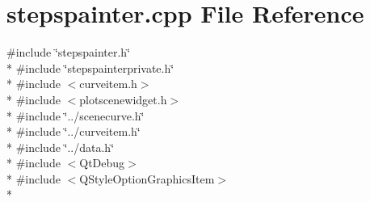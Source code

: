 \section{stepspainter.\+cpp File Reference}
\label{curve_2painters_2stepspainter_8cpp}
{\ttfamily \#include \char`\"{}stepspainter.\+h\char`\"{}}\\*
{\ttfamily \#include \char`\"{}stepspainterprivate.\+h\char`\"{}}\\*
{\ttfamily \#include $<$curveitem.\+h$>$}\\*
{\ttfamily \#include $<$plotscenewidget.\+h$>$}\\*
{\ttfamily \#include \char`\"{}../scenecurve.\+h\char`\"{}}\\*
{\ttfamily \#include \char`\"{}../curveitem.\+h\char`\"{}}\\*
{\ttfamily \#include \char`\"{}../data.\+h\char`\"{}}\\*
{\ttfamily \#include $<$Qt\+Debug$>$}\\*
{\ttfamily \#include $<$Q\+Style\+Option\+Graphics\+Item$>$}\\*
